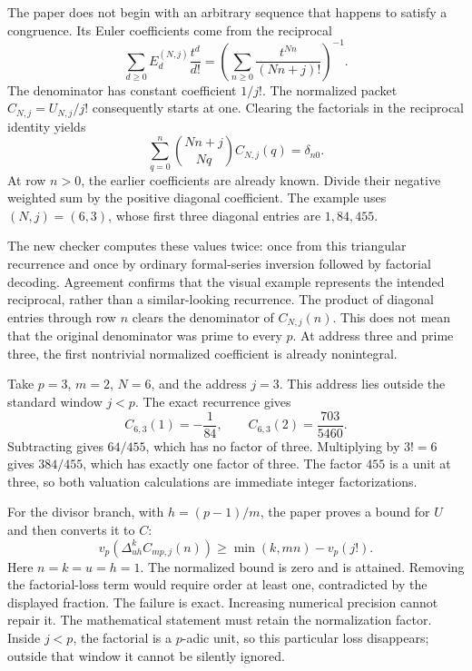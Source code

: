 The paper does not begin with an arbitrary sequence that happens to satisfy a congruence. Its Euler coefficients come from the reciprocal
\[
 \sum_{d\ge0}E_d^{(N,j)}\frac{t^d}{d!}
 =\left(\sum_{n\ge0}\frac{t^{Nn}}{(Nn+j)!}\right)^{-1}.
\]
The denominator has constant coefficient $1/j!$. The normalized packet $C_{N,j}=U_{N,j}/j!$ consequently starts at one.
Clearing the factorials in the reciprocal identity yields
\[
 \sum_{q=0}^n\binom{Nn+j}{Nq}C_{N,j}(q)=\delta_{n0}.
\]
At row $n>0$, the earlier coefficients are already known. Divide their negative weighted sum by the positive diagonal coefficient. The example uses $(N,j)=(6,3)$, whose first three diagonal entries are $1,84,455$.

The new checker computes these values twice: once from this triangular recurrence and once by ordinary formal-series inversion followed by factorial decoding. Agreement confirms that the visual example represents the intended reciprocal, rather than a similar-looking recurrence.
The product of diagonal entries through row $n$ clears the denominator of $C_{N,j}(n)$. This does not mean that the original denominator was prime to every $p$. At address three and prime three, the first nontrivial normalized coefficient is already nonintegral.

Take $p=3$, $m=2$, $N=6$, and the address $j=3$. This address lies outside the standard window $j<p$. The exact recurrence gives
\[
 C_{6,3}(1)=-\frac1{84},\qquad
 C_{6,3}(2)=\frac{703}{5460}.
\]
Subtracting gives $64/455$, which has no factor of three. Multiplying by $3!=6$ gives $384/455$, which has exactly one factor of three. The factor $455$ is a unit at three, so both valuation calculations are immediate integer factorizations.

For the divisor branch, with $h=(p-1)/m$, the paper proves a bound for $U$ and then converts it to $C$:
\[
 v_p(\Delta_{uh}^k C_{mp,j}(n))
 \ge \min(k,mn)-v_p(j!).
\]
Here $n=k=u=h=1$. The normalized bound is zero and is attained. Removing the factorial-loss term would require order at least one, contradicted by the displayed fraction.
The failure is exact. Increasing numerical precision cannot repair it. The mathematical statement must retain the normalization factor. Inside $j<p$, the factorial is a $p$-adic unit, so this particular loss disappears; outside that window it cannot be silently ignored.

